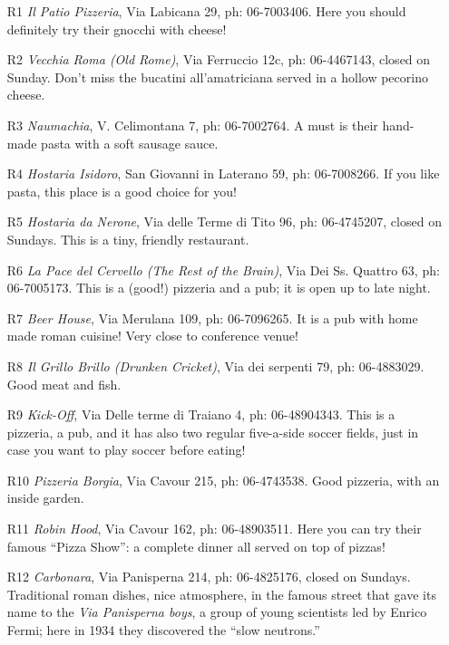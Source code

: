 \documentclass[twocolumn,10pt]{article}
\begin{document}
\begin{enumerate}

\item[R1] {\em Il Patio Pizzeria}, Via Labicana 29, ph: 06-7003406. Here you should definitely try their gnocchi with cheese!

\item[R2] {\em Vecchia Roma (Old Rome)}, Via Ferruccio 12c, ph: 
06-4467143, closed on Sunday. Don't miss the bucatini all'amatriciana served in a hollow pecorino cheese.

\item[R3] {\em Naumachia},  V. Celimontana 7, ph: 
06-7002764. A must is their hand-made pasta with a soft sausage sauce. 

\item[R4] {\em Hostaria Isidoro}, San Giovanni in Laterano 59, ph: 
06-7008266. If you like pasta, this place is a good choice for you!

\item[R5] {\em Hostaria da Nerone}, Via delle Terme di Tito 96, ph: 06-4745207, closed on Sundays. This is a tiny, friendly restaurant.  

\item[R6] {\em La Pace del Cervello (The Rest of the Brain)}, Via Dei Ss. Quattro 63, ph: 06-7005173. This is a (good!) pizzeria and a pub; it is open up to late night.

\item[R7] {\em Beer House}, Via Merulana 109, ph: 
06-7096265. It is a pub with home made roman cuisine! Very close to conference venue!

\item[R8] {\em Il Grillo Brillo (Drunken Cricket)}, Via dei serpenti 79, ph: 06-4883029. Good meat and fish.

\item[R9] {\em Kick-Off}, Via Delle terme di Traiano 4, ph: 06-48904343. This is a pizzeria, a pub, and it has also two regular five-a-side soccer fields, just in case you want to play soccer before eating!

\item[R10] {\em Pizzeria Borgia}, Via Cavour 215, ph: 06-4743538. Good pizzeria, with an inside garden.

\item[R11] {\em Robin Hood}, Via Cavour 162, ph: 
06-48903511. Here you can try their famous ``Pizza Show'': a complete dinner all served on top of pizzas!

\item[R12] {\em Carbonara}, Via Panisperna 214, ph: 06-4825176, closed
on Sundays. Traditional roman dishes, nice atmosphere, in the famous
street that gave its name to the \emph{Via Panisperna boys}, a group of
young scientists led by Enrico Fermi; here in 1934 they discovered the
``slow neutrons.''


\end{enumerate}
\end{document}

